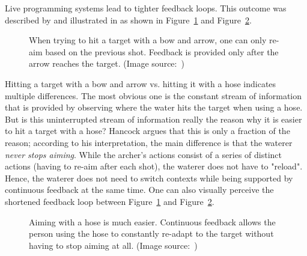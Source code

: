 Live programming systems lead to tighter feedback loops.
This outcome was described by \citeauthor{hancock_real-time_2003} \cite{hancock_real-time_2003} and illustrated in \cite{aguiar_live_2019} as shown in Figure~\ref{fig:bow-arrow} and Figure~\ref{fig:waterhose}.
%
\begin{figure}[h]
\centering

\caption{When trying to hit a target with a bow and arrow, one can only re-aim based on the previous shot. Feedback is provided only after the arrow reaches the target. (Image source:~\cite{aguiar_live_2019})}
\label{fig:bow-arrow}
\end{figure}
%
Hitting a target with a bow and arrow vs. hitting it with a hose indicates multiple differences.
The most obvious one is the constant stream of information that is provided by observing where the water hits the target when using a hose.
But is this uninterrupted stream of information really the reason why it is easier to hit a target with a hose?
Hancock \cite{hancock_real-time_2003} argues that this is only a fraction of the reason; according to his interpretation, the main difference is that the waterer \emph{never stops aiming}.
While the archer's actions consist of a series of distinct actions (having to re-aim after each shot), the waterer does not have to "reload".
Hence, the waterer does not need to switch contexts while being supported by continuous feedback at the same time.
One can also visually perceive the shortened feedback loop between Figure~\ref{fig:bow-arrow} and Figure~\ref{fig:waterhose}.

\begin{figure}[h]
\centering

\caption{Aiming with a hose is much easier. Continuous feedback allows the person using the hose to constantly re-adapt to the target without having to stop aiming at all. (Image source:~\cite{aguiar_live_2019})}
\label{fig:waterhose}
\end{figure}


